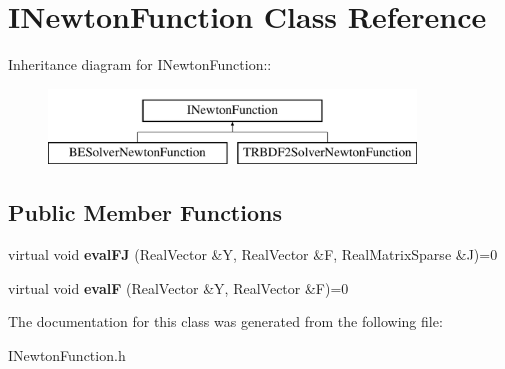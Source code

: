 \hypertarget{classINewtonFunction}{
\section{INewtonFunction Class Reference}
\label{classINewtonFunction}
}
Inheritance diagram for INewtonFunction::\begin{figure}[H]
\begin{center}
\leavevmode
\includegraphics[height=2cm]{classINewtonFunction}
\end{center}
\end{figure}
\subsection*{Public Member Functions}
\begin{DoxyCompactItemize}
\item 
\hypertarget{classINewtonFunction_a26ac6ae8e59e3b7ceef68e80a8f688fa}{
virtual void {\bfseries evalFJ} (RealVector \&Y, RealVector \&F, RealMatrixSparse \&J)=0}
\label{classINewtonFunction_a26ac6ae8e59e3b7ceef68e80a8f688fa}

\item 
\hypertarget{classINewtonFunction_a2e0e667ea7ea91747554e6da128a246e}{
virtual void {\bfseries evalF} (RealVector \&Y, RealVector \&F)=0}
\label{classINewtonFunction_a2e0e667ea7ea91747554e6da128a246e}

\end{DoxyCompactItemize}


The documentation for this class was generated from the following file:\begin{DoxyCompactItemize}
\item 
INewtonFunction.h\end{DoxyCompactItemize}
